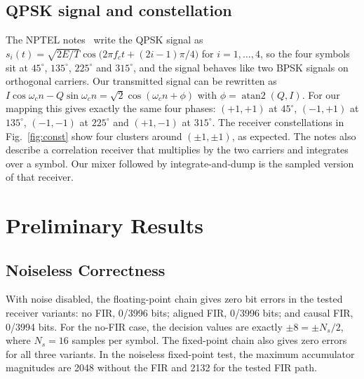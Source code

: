 \documentclass[10pt,twocolumn,letterpaper]{article}
\newcommand{\newstart}{\begingroup\color{blue}}
\newcommand{\newend}{\endgroup}
\begin{document}
\subsection{QPSK signal and constellation}
The NPTEL notes~\cite{qpsk_nptel} write the QPSK signal as
$s_i(t)=\sqrt{2E/T}\cos\!\big(2\pi f_ct+(2i-1)\pi/4\big)$ for $i=1,\dots,4$,
so the four symbols sit at $45^\circ$, $135^\circ$, $225^\circ$ and
$315^\circ$, and the signal behaves like two BPSK signals on orthogonal
carriers. Our transmitted signal can be rewritten as
$I\cos\omega_cn-Q\sin\omega_cn=\sqrt2\cos(\omega_cn+\phi)$ with
$\phi=\operatorname{atan2}(Q,I)$. For our mapping this gives exactly the same four
phases: $(+1,+1)$ at $45^\circ$, $(-1,+1)$ at $135^\circ$, $(-1,-1)$ at
$225^\circ$ and $(+1,-1)$ at $315^\circ$. The receiver constellations in
Fig.~\ref{fig:const} show four clusters around $(\pm1,\pm1)$, as expected.
The notes also describe a correlation receiver that multiplies by the two
carriers and integrates over a symbol. Our mixer followed by integrate-and-dump
is the sampled version of that receiver.

\newend

\newstart
\section{Preliminary Results}

\subsection{Noiseless Correctness}
With noise disabled, the floating-point chain gives zero bit errors in the tested receiver variants: no FIR, 0/3996 bits; aligned FIR, 0/3996 bits; and causal FIR, 0/3994 bits. For the no-FIR case, the decision values are exactly $\pm 8=\pm N_s/2$, where $N_s=16$ samples per symbol. The fixed-point chain also gives zero errors for all three variants. In the noiseless fixed-point test, the maximum accumulator magnitudes are 2048 without the FIR and 2132 for the tested FIR path.

\end{document}
